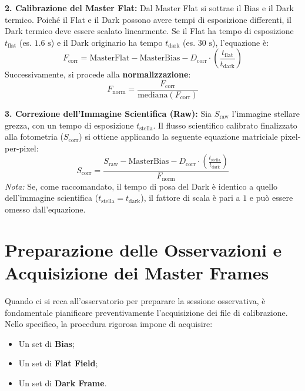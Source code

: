 \textbf{2. Calibrazione del Master Flat:}
Dal Master Flat si sottrae il Bias e il Dark termico. Poiché il Flat e il Dark possono avere tempi di esposizione differenti, il Dark termico deve essere scalato linearmente.
Se il Flat ha tempo di esposizione $t_{\text{flat}}$ (es. $1.6 \text{ s}$) e il Dark originario ha tempo $t_{\text{dark}}$ (es. $30 \text{ s}$), l'equazione è:
\begin{equation}
F_{\text{corr}} = \text{MasterFlat} - \text{MasterBias} - D_{\text{corr}} \cdot \left( \frac{t_{\text{flat}}}{t_{\text{dark}}} \right)
\end{equation}
Successivamente, si procede alla \textbf{normalizzazione}:
\begin{equation}
F_{\text{norm}} = \frac{F_{\text{corr}}}{\text{mediana}(F_{\text{corr}})}
\end{equation}

\textbf{3. Correzione dell'Immagine Scientifica (Raw):}
Sia $S_{\text{raw}}$ l'immagine stellare grezza, con un tempo di esposizione $t_{\text{stella}}$. Il flusso scientifico calibrato finalizzato alla fotometria ($S_{\text{corr}}$) si ottiene applicando la seguente equazione matriciale pixel-per-pixel:
\begin{equation}
S_{\text{corr}} = \frac{S_{\text{raw}} - \text{MasterBias} - D_{\text{corr}} \cdot \left( \frac{t_{\text{stella}}}{t_{\text{dark}}} \right)}{F_{\text{norm}}}
\end{equation}
\textit{Nota:} Se, come raccomandato, il tempo di posa del Dark è identico a quello dell'immagine scientifica ($t_{\text{stella}} = t_{\text{dark}}$), il fattore di scala è pari a $1$ e può essere omesso dall'equazione.

\section{Preparazione delle Osservazioni e Acquisizione dei Master Frames}

Quando ci si reca all'osservatorio per preparare la sessione osservativa, è fondamentale pianificare preventivamente l'acquisizione dei file di calibrazione. Nello specifico, la procedura rigorosa impone di acquisire:
\begin{itemize}
\item Un set di \textbf{Bias};
\item Un set di \textbf{Flat Field};
\item Un set di \textbf{Dark Frame}.
\end{itemize}

